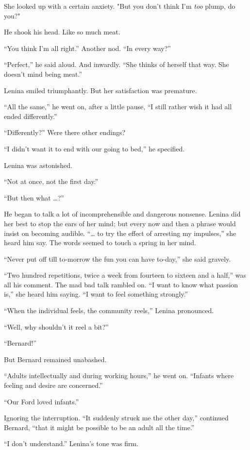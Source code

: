 \documentclass[12pt]{report}
\begin{document}
She looked up with a certain anxiety. "But you don't think I'm
\emph{too} plump, do you?"

He shook his head. Like so much meat.

``You think I'm all right.'' Another nod. ``In every way?''

``Perfect,'' he said aloud. And inwardly. ``She thinks of herself that
way. She doesn't mind being meat.''

Lenina smiled triumphantly. But her satisfaction was premature.

``All the same,'' he went on, after a little pause, ``I still rather
wish it had all ended differently.''

``Differently?'' Were there other endings?

``I didn't want it to end with our going to bed,'' he specified.

Lenina was astonished.

``Not at once, not the first day.''

``But then what \ldots{}?''

He began to talk a lot of incomprehensible and dangerous nonsense.
Lenina did her best to stop the ears of her mind; but every now and then
a phrase would insist on becoming audible. ``\ldots{} to try the effect
of arresting my impulses,'' she heard him say. The words seemed to touch
a spring in her mind.

``Never put off till to-morrow the fun you can have to-day,'' she said
gravely.

``Two hundred repetitions, twice a week from fourteen to sixteen and a
half,'' was all his comment. The mad bad talk rambled on. ``I want to
know what passion is,'' she heard him saying. ``I want to feel something
strongly.''

``When the individual feels, the community reels,'' Lenina pronounced.

``Well, why shouldn't it reel a bit?''

``Bernard!''

But Bernard remained unabashed.

``Adults intellectually and during working hours,'' he went on.
``Infants where feeling and desire are concerned.''

``Our Ford loved infants.''

Ignoring the interruption. ``It suddenly struck me the other day,''
continued Bernard, ``that it might be possible to be an adult all the
time.''

``I don't understand.'' Lenina's tone was firm.
\end{document}
